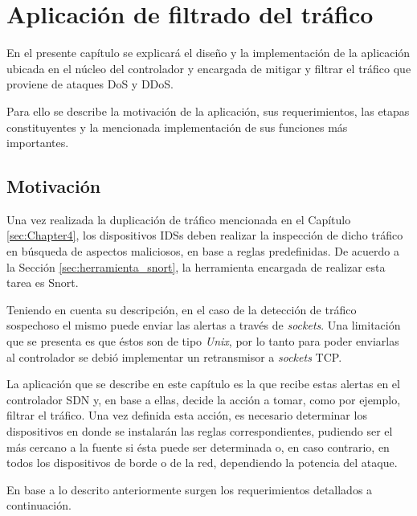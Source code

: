 \chapter{Aplicación de filtrado del tráfico} %

\label{sec:Chapter5} %

En el presente capítulo se explicará el diseño y la implementación de la
aplicación ubicada en el núcleo del controlador y encargada de mitigar y filtrar
el tráfico que proviene de ataques DoS y DDoS.

Para ello se describe la motivación de la aplicación, sus requerimientos, las
etapas constituyentes y la mencionada implementación de sus funciones más
importantes.

\section {Motivación}

Una vez realizada la duplicación de tráfico mencionada en el Capítulo
\ref{sec:Chapter4}, los dispositivos IDSs deben realizar la inspección de dicho
tráfico en búsqueda de aspectos maliciosos, en base a reglas predefinidas. De
acuerdo a la Sección \ref{sec:herramienta_snort}, la herramienta encargada de
realizar esta tarea es Snort.

Teniendo en cuenta su descripción, en el caso de la detección de tráfico
sospechoso el mismo puede enviar las alertas a través de \textit{sockets}. Una
limitación que se presenta es que éstos son de tipo \textit{Unix}, por lo tanto
para poder enviarlas al controlador se debió implementar un retransmisor a
\textit{sockets} TCP.

La aplicación que se describe en este capítulo es la que recibe estas alertas en
el controlador SDN y, en base a ellas, decide la acción a tomar, como por ejemplo,
filtrar el tráfico. Una vez definida esta acción, es necesario determinar los
dispositivos en donde se instalarán las reglas correspondientes, pudiendo ser el
más cercano a la fuente si ésta puede ser determinada o, en caso contrario, en
todos los dispositivos de borde o de la red, dependiendo la potencia del ataque.

En base a lo descrito anteriormente surgen los requerimientos detallados a
continuación.

